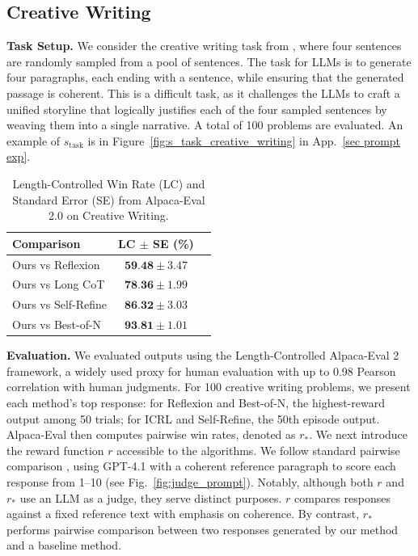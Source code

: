 \documentclass{article}
\newcommand{\0}{\mathbf{0}}
\begin{document}
\subsection{Creative Writing}
\textbf{Task Setup.} We consider the creative writing task from \cite{tot}, where four sentences are randomly sampled from a pool of sentences. The task for LLMs is to generate four paragraphs, each ending with a sentence, while ensuring that the generated passage is coherent. This is a difficult task, as it challenges the LLMs to craft a unified storyline that logically justifies each of the four sampled sentences by weaving them into a single narrative. A total of 100 problems are evaluated. An example of $s_\text{task}$ is in Figure~\ref{fig:s_task_creative_writing} in App.~\ref{sec prompt exp}.\\
\begin{table}
  \centering
  \caption{Length-Controlled Win Rate (LC) and Standard Error (SE) from Alpaca-Eval 2.0 on Creative Writing.}
  \label{tab:pairwise_win_rates}
  \begin{tabular}{@{}lcc@{}}
    \toprule
    Comparison                   & LC  $\pm$ SE (\%) \\
    \midrule
    Ours vs Reflexion            & $\textbf{59.48}          \pm 3.47$                 \\
    Ours vs Long CoT     & $\textbf{78.36}           \pm 1.99$               \\
    Ours vs Self-Refine          & $\textbf{86.32}            \pm 3.03$                 \\
    Ours vs Best-of-N            & $\textbf{93.81}           \pm 1.01$                 \\
    \bottomrule
  \end{tabular}
\end{table}
\textbf{Evaluation.}
We evaluated outputs using the Length-Controlled Alpaca-Eval 2 \citep{alpaca_eval} framework, a widely used proxy for human evaluation \citep{hong-etal-2024-orpo, kto, meng2024simposimplepreferenceoptimization} with up to 0.98 Pearson correlation with human judgments. For 100 creative writing problems, we present each method’s top response: for Reflexion and Best-of-N, the highest-reward output among 50 trials; for ICRL and Self-Refine, the 50th episode output. Alpaca-Eval then computes pairwise win rates, denoted as $r_*$.
We next introduce the reward function $r$ accessible to the algorithms. We follow standard pairwise comparison \citep{zheng2023judgingllmasajudgemtbenchchatbot}, using GPT-4.1 with a coherent reference paragraph to score each response from 1--10 (see Fig.~\ref{fig:judge_prompt}). Notably, although both  $r$ and $r_*$ use an LLM as a judge, they serve distinct purposes. $r$ compares responses against a fixed reference text with emphasis on coherence. By contrast, $r_*$ performs pairwise comparison between two responses generated by our method and a baseline method.
\end{document}
